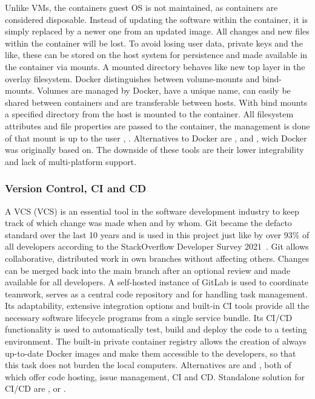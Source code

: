 \documentclass[12pt, a4paper]{article}
\begin{document}
        Unlike \ac{VM}s, the containers guest \ac{OS} is not maintained, as containers are considered disposable. Instead of updating the software within the container, it is simply replaced by a newer one from an updated image. All changes and new files within the container will be lost. To avoid losing user data, private keys and the like, these can be stored on the host system for persistence and made available in the container via mounts. A mounted directory behaves like new top layer in the overlay filesystem. Docker distinguishes between volume-mounts and bind-mounts. Volumes are managed by Docker, have a unique name, can easily be shared between containers and are transferable between hosts. With bind mounts a specified directory from the host is mounted to the container. All filesystem attributes and file properties are passed to the container, the management is done of that mount is up to the user \cite{docker2020}, \cite{dockerdocs}.\newline
        Alternatives to Docker are ,  and , wich Docker was originally based on. The downside of these tools are their lower integrability and lack of multi-platform support.
        \subsubsection{Version Control, \acl{CI} and \acl{CD}}
        A \acl{VCS} (\ac{VCS}) is an essential tool in the software development industry to keep track of which change was made when and by whom. Git became the defacto standard over the last 10 years and is used in this project just like by over 93\% of all developers according to the StackOverflow Developer Survey 2021~\cite{stackoverflow2018}. Git allows collaborative, distributed work in own branches without affecting others. Changes can be merged back into the main branch after an optional review and made available for all developers. A self-hosted instance of GitLab is used to coordinate teamwork, serves as a central code repository and for handling task management. Its adaptability, extensive integration options and built-in \ac{CI} tools provide all the necessary software lifecycle programs from a single service bundle. Its \ac{CI}/\ac{CD} functionality is used to automatically test, build and deploy the code to a testing environment. The built-in private container registry allows the creation of always up-to-date Docker images and make them accessible to the developers, so that this task does not burden the local computers. Alternatives are  and , both of which offer code hosting, issue management, \ac{CI} and \ac{CD}. Standalone solution for \ac{CI}/\ac{CD} are ,  or .
\end{document}
